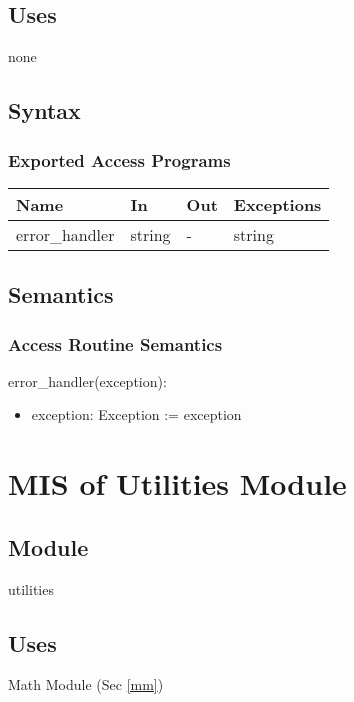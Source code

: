 \documentclass[12pt, titlepage]{article}
\begin{document}
\subsection{Uses}
none

\subsection{Syntax}

\subsubsection{Exported Access Programs}

\begin{center}
\begin{tabular}{p{4cm} p{3cm} p{2cm} p{2.5cm}}
\hline
\textbf{Name} & \textbf{In} & \textbf{Out} & \textbf{Exceptions} \\
\hline
error\_handler & string & - & string \\
\hline
\end{tabular}
\end{center}

\subsection{Semantics}

\subsubsection{Access Routine Semantics}

\noindent error\_handler(exception):
\begin{itemize}
\item exception: Exception := exception
\end{itemize}

\newpage

\section{MIS of Utilities Module} \label{um}

\subsection{Module}
utilities

\subsection{Uses}
Math Module (Sec \ref{mm})
\end{document}
